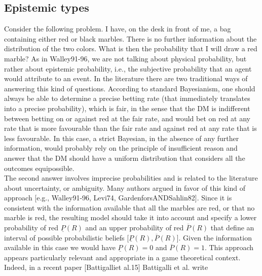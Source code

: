 \documentclass[fleqn,reqno,11pt]{article}
\begin{document}
\fi


\subsection{Epistemic types}
\label{sec:epistemic-types}


Consider the following problem. I have, on the desk in front of me, a bag containing either red or black marbles. There is no further information about the distribution of the two colors. What is then the probability that I will draw a red marble? As in Walley91-96, we are not talking about physical probability, but rather about epistemic probability, i.e., the subjective probability that an agent would attribute to an event.
In the literature there are two traditional ways of answering this kind of questions. According to standard Bayesianism, one should always be able to determine a precise betting rate (that immediately translates into a precise probability), which is fair, in the sense that the DM is indifferent between betting on or against red at the fair rate, and would bet on red at any rate that is more favourable than the fair rate and against red at any rate that is less favourable. In this case, a strict Bayesian, in the absence of any further information, would probably rely on the principle of insufficient reason and answer that the DM should have a uniform distribution that considers all the outcomes equipossible. \\
The second answer involves imprecise probabilities and is related to the literature about uncertainty, or ambiguity. Many authors argued in favor of this kind of approach [e.g., Walley91-96, Levi74, GardenforsANDSahlin82]. Since it is consistent with the information available that all the marbles are red, or that no marble is red, the resulting model should take it into account and specify a lower probability of red $\underline{P}(R)$ and an upper probability of red $\overline{P}(R)$ that define an interval of possible probabilistic beliefs [$\underline{P}(R), \overline{P}(R)$]. Given the information available in this case we would have $\underline{P}(R)=0$ and $\overline{P}(R)=1$. This approach appears particularly relevant and appropriate in a game theoretical context. Indeed, in a recent paper [Battigalliet al.15] Battigalli et al. write
\end{document}
